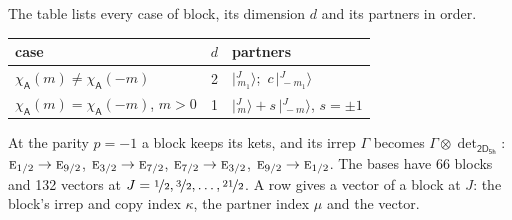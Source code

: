 \documentclass[10pt,a4paper]{article}
\numberwithin{equation}{section}
\newcommand{\grp}[1]{\mathsf{#1}}
\newcommand{\irr}[1]{\text{\normalfont\scshape #1}}
\newcommand{\chiA}{\chi_{\grp{A}}}
\newcommand{\irrprod}{\otimes}
\newcommand{\mult}{\kappa}
\newcommand{\intx}{\mu}
\newcommand{\jm}[2]{\bigl\lvert{}^{#1}_{\,#2}\bigr\rangle}
\begin{document}
\leavevmode\label{n:head.case}\label{n:head.partners}The table lists every case of block, its dimension $d$ and its partners in order.
\begin{center}\begin{tabular}{@{}lrl@{}}\toprule
case & $d$ & partners\\\midrule
$\chiA(m) \ne \chiA(-m)$ & 2 & $\jm{J}{m_1}$;\ $c\,\jm{J}{-m_1}$\\
$\chiA(m) = \chiA(-m)$, $m > 0$ & 1 & $\jm{J}{m} + s\,\jm{J}{-m}$, $s = \pm1$\\
\bottomrule\end{tabular}\end{center}
At the parity $p = -1$ a block keeps its kets, and its irrep $\Gamma$ becomes $\Gamma \irrprod \det_{\grp{2D_{5h}}}$: $\irr{e}_{1/2} \to \irr{e}_{9/2}$, $\irr{e}_{3/2} \to \irr{e}_{7/2}$, $\irr{e}_{7/2} \to \irr{e}_{3/2}$, $\irr{e}_{9/2} \to \irr{e}_{1/2}$.
The bases have 66 blocks and 132 vectors at $J = \nicefrac{1}{2}, \nicefrac{3}{2}, \dots, \nicefrac{21}{2}$. \label{n:head.vector}A row gives a vector of a block at $J$: the block's irrep and copy index $\mult$, the partner index $\intx$ and the vector.
\end{document}
